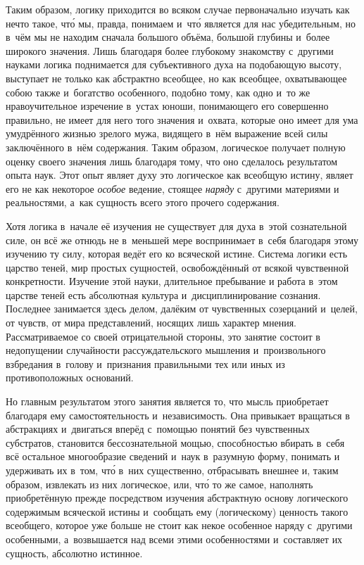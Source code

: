 Таким образом, логику приходится во всяком случае первоначально изучать как
нечто такое, чт\'{о} мы, правда, понимаем и~чт\'{о} является для нас
убедительным,
но в~чём мы не находим сначала большого объёма, большой глубины и~более
широкого значения. Лишь благодаря более глубокому знакомству с~другими
науками логика поднимается для субъективного духа на подобающую высоту,
выступает не только как абстрактно всеобщее, но как всеобщее, охватывающее
собою также и~богатство особенного, подобно тому, как одно и~то же
нравоучительное изречение в~устах юноши, понимающего его совершенно
правильно, не имеет для него того значения и~охвата, которые оно имеет для
ума умудрённого жизнью зрелого мужа, видящего в~нём выражение всей силы
заключённого в~нём содержания. Таким образом, логическое получает полную
оценку своего значения лишь благодаря тому, что оно сделалось результатом
опыта наук. Этот опыт являет духу это логическое как всеобщую истину,
являет его не как некоторое {\em особое} ведение,
стоящее {\em наряду} с~другими материями и
реальностями, а~как сущность всего этого прочего содержания.

Хотя логика в~начале её изучения не существует для духа в~этой сознательной
силе, он всё же отнюдь не в~меньшей мере воспринимает в~себя благодаря
этому изучению ту силу, которая ведёт его ко всяческой истине. Система
логики есть царство теней, мир простых сущностей, освобождённый от всякой
чувственной конкретности. Изучение этой науки, длительное пребывание и
работа в~этом царстве теней есть абсолютная культура и~дисциплинирование
сознания. Последнее занимается здесь делом, далёким от чувственных
созерцаний и~целей, от чувств, от мира представлений, носящих лишь характер
мнения. Рассматриваемое со своей отрицательной стороны, это занятие состоит
в недопущении случайности рассуждательского мышления и~произвольного
взбредания в~голову и~признания правильными тех или иных из
противоположных оснований.

Но главным результатом этого занятия является то, что мысль приобретает
благодаря ему самостоятельность и~независимость. Она привыкает вращаться в
абстракциях и~двигаться вперёд с~помощью понятий без чувственных
субстратов, становится бессознательной мощью, способностью вбирать в~себя
всё остальное многообразие сведений и~наук в~разумную форму, понимать и
удерживать их в~том, чт\'{о} в~них существенно, отбрасывать внешнее и, таким
образом, извлекать из них логическое, или, чт\'{о} то же самое, наполнять
приобретённую прежде посредством изучения абстрактную основу логического
содержимым всяческой истины и~сообщать ему (логическому) ценность такого
всеобщего, которое уже больше не стоит как некое особенное наряду с~другими
особенными, а~возвышается над всеми этими особенностями и~составляет их
сущность, абсолютно истинное.

